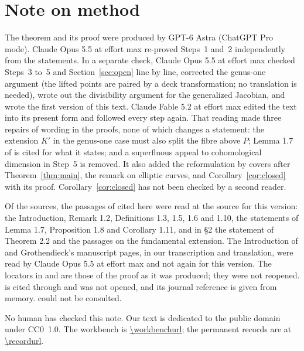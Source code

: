 \section*{Note on method}
The theorem and its proof were produced by GPT-6 Astra (ChatGPT Pro mode). Claude Opus 5.5 at effort max re-proved Steps~1 and~2 independently from the statements. In a separate check, Claude Opus 5.5 at effort max checked Steps~3 to~5 and Section~\ref{sec:open} line by line, corrected the genus-one argument (the lifted points are paired by a deck transformation; no translation is needed), wrote out the divisibility argument for the generalized Jacobian, and wrote the first version of this text. Claude Fable 5.2 at effort max edited the text into its present form and followed every step again. That reading made three repairs of wording in the proofs, none of which changes a statement: the extension $K'$ in the genus-one case must also split the fibre above $P$; Lemma 1.7 of \cite{ST09} is cited for what it states; and a superfluous appeal to cohomological dimension in Step~5 is removed. It also added the reformulation by covers after Theorem~\ref{thm:main}, the remark on elliptic curves, and Corollary~\ref{cor:closed} with its proof. Corollary~\ref{cor:closed} has not been checked by a second reader.

Of the sources, the passages of \cite{ST09} cited here were read at the source for this version: the Introduction, Remark 1.2, Definitions 1.3, 1.5, 1.6 and 1.10, the statements of Lemma 1.7, Proposition 1.8 and Corollary 1.11, and in \S 2 the statement of Theorem 2.2 and the passages on the fundamental extension. The Introduction of \cite{ST18} and Grothendieck's manuscript pages, in our transcription and translation, were read by Claude Opus 5.5 at effort max and not again for this version. The locators in \cite{SGA1} and \cite{WeilI} are those of the proof as it was produced; they were not reopened. \cite{Moch} is cited through \cite[\S 2]{ST09} and was not opened, and its journal reference is given from memory. \cite{Stix} could not be consulted.

No human has checked this note. Our text is dedicated to the public domain under CC0~1.0. The workbench is \expandafter\url\expandafter{\workbenchurl}; the permanent records are at \expandafter\url\expandafter{\recordurl}.

